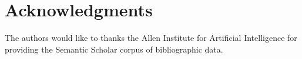 \documentclass[11pt,a4paper,openany,oneside]{book}
\theoremstyle{definition}
\begin{document}
	
	
	
    
    
	
	

    
    
    
    
    
    
    \chapter*{Acknowledgments}

The authors would like to thanks the Allen Institute for Artificial Intelligence for providing the Semantic Scholar corpus of bibliographic data.


%    
\newpage


%    
\end{document}
